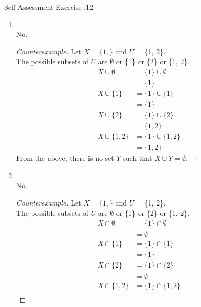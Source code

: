 \documentclass[\main/notes.tex]{subfiles}
\begin{document}
\begin{exercise}{Self Assessment Exercise \thechapter.12}
\begin{enumerate}
\begin{proof}
\begin{enumerate}[label=(\roman*)]
							\end{enumerate}
							As the first claim is false, it is not the case that $V \cap W = \emptyset$ iff $V = \emptyset$ or $W = \emptyset$.
						\end{proof}
					\pagebreak
					\item {}\\
						No.
						\begin{proof}[Counterexample]
							Let $X = \{1,\}$ and $U$ = \{1, 2\}.\\
							The possible subsets of $U$ are $\emptyset$ or \{1\} or \{2\} or \{1, 2\}.
							\begin{align*}
								X \cup \emptyset &= \{1\} \cup \emptyset\\
								&= \{1\}\\
								X \cup \{1\} &= \{1\} \cup \{1\}\\
								&= \{1\}\\
								X \cup \{2\} &= \{1\} \cup \{2\}\\
								&= \{1, 2\}\\
								X \cup \{1, 2\} &= \{1\} \cup \{1, 2\}\\
								&= \{1, 2\}
							\end{align*}
							From the above, there is no set $Y$ such that $X \cup Y = \emptyset$.
						\end{proof}
					\item {}\\
						No.
						\begin{proof}[Counterexample]
							Let $X = \{1,\}$ and $U$ = \{1, 2\}.\\
							The possible subsets of $U$ are $\emptyset$ or \{1\} or \{2\} or \{1, 2\}.
							\begin{align*}
								X \cap \emptyset &= \{1\} \cap \emptyset\\
								&= \emptyset\\
								X \cap \{1\} &= \{1\} \cap \{1\}\\
								&= \{1\}\\
								X \cap \{2\} &= \{1\} \cap \{2\}\\
								&= \emptyset\\
								X \cap \{1, 2\} &= \{1\} \cap \{1, 2\}\\

\end{align*}
\end{proof}
\end{enumerate}
\end{exercise}
\end{document}
